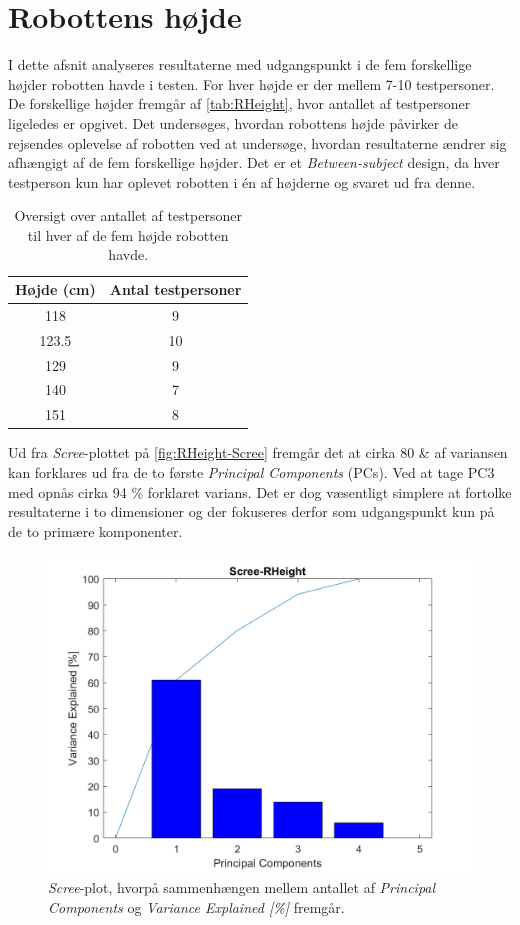 \section{Robottens højde}
\label{DatabehandlingRHeight}
%
I dette afsnit analyseres resultaterne med udgangspunkt i de fem forskellige højder robotten havde i testen. For hver højde er der mellem 7-10 testpersoner. De forskellige højder fremgår af \autoref{tab:RHeight}, hvor antallet af testpersoner ligeledes er opgivet. Det undersøges, hvordan robottens højde påvirker de rejsendes oplevelse af robotten ved at undersøge, hvordan resultaterne ændrer sig afhængigt af de fem forskellige højder. Det er et \textit{Between-subject} design, da hver testperson kun har oplevet robotten i én af højderne og svaret ud fra denne.
%
\begin{table}[H]
\centering
\begin{tabular}{c|c}
Højde (cm) & Antal testpersoner \\ \hline
118   & 9     \\ \hline
123.5 & 10    \\ \hline
129   & 9     \\ \hline
140   & 7     \\ \hline
151   & 8    \\
\end{tabular}
\caption{Oversigt over antallet af testpersoner til hver af de fem højde robotten havde.}
\label{tab:RHeight}
\end{table}
\noindent
%
Ud fra \textit{Scree}-plottet på \autoref{fig:RHeight-Scree} fremgår det at cirka 80 \& af variansen kan forklares ud fra de to første \textit{Principal Components} (PCs). Ved at tage PC3 med opnås cirka 94 \% forklaret varians. Det er dog væsentligt simplere at fortolke resultaterne i to dimensioner og der fokuseres derfor som udgangspunkt kun på de to primære komponenter.
%
\begin{figure}[H]
\centering
\includegraphics[width=\textwidth]{Figure/DatabehandlingSkalaer/PCAfigures/RHeight-Scree.png}
\caption{\textit{Scree}-plot, hvorpå sammenhængen mellem antallet af \textit{Principal Components} og \textit{Variance Explained [\%]} fremgår.}
\label{fig:RHeight-Scree}
\end{figure}
